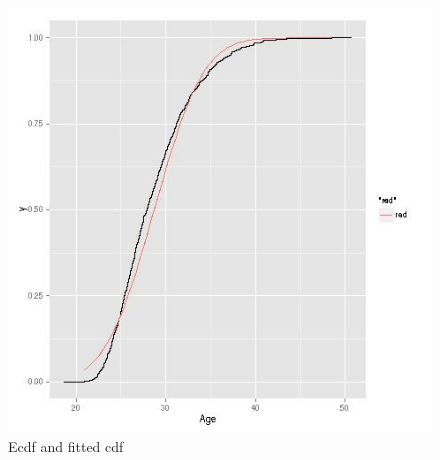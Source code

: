 \begin{figure}[tb]
\vskip 0.5in
\centerline{
\includegraphics[width=4.5in]{BaseballAge.jpg} 
}
\caption{Ecdf and fitted cdf}
\label{ecdfpnorm}
\end{figure}

% 
% 
% 

